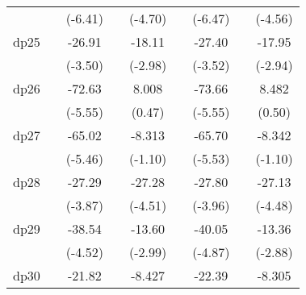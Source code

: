 {\begin{tabular}{l*{8}{c}}
            &                     &     (-6.41)         &                     &     (-4.70)         &                     &     (-6.47)         &                     &     (-4.56)         \\
[1em]
dp25        &                     &      -26.91\sym{***}&                     &      -18.11\sym{**} &                     &      -27.40\sym{***}&                     &      -17.95\sym{**} \\
            &                     &     (-3.50)         &                     &     (-2.98)         &                     &     (-3.52)         &                     &     (-2.94)         \\
[1em]
dp26        &                     &      -72.63\sym{***}&                     &       8.008         &                     &      -73.66\sym{***}&                     &       8.482         \\
            &                     &     (-5.55)         &                     &      (0.47)         &                     &     (-5.55)         &                     &      (0.50)         \\
[1em]
dp27        &                     &      -65.02\sym{***}&                     &      -8.313         &                     &      -65.70\sym{***}&                     &      -8.342         \\
            &                     &     (-5.46)         &                     &     (-1.10)         &                     &     (-5.53)         &                     &     (-1.10)         \\
[1em]
dp28        &                     &      -27.29\sym{***}&                     &      -27.28\sym{***}&                     &      -27.80\sym{***}&                     &      -27.13\sym{***}\\
            &                     &     (-3.87)         &                     &     (-4.51)         &                     &     (-3.96)         &                     &     (-4.48)         \\
[1em]
dp29        &                     &      -38.54\sym{***}&                     &      -13.60\sym{**} &                     &      -40.05\sym{***}&                     &      -13.36\sym{**} \\
            &                     &     (-4.52)         &                     &     (-2.99)         &                     &     (-4.87)         &                     &     (-2.88)         \\
[1em]
dp30        &                     &      -21.82\sym{**} &                     &      -8.427         &                     &      -22.39\sym{**} &                     &      -8.305         \\

\end{tabular}}
